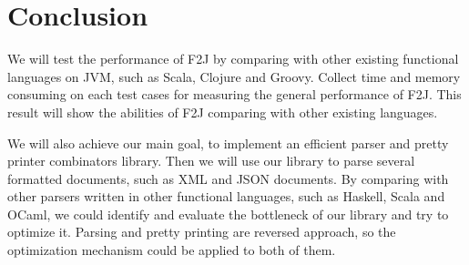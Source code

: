 \chapter{Conclusion}

We will test the performance of F2J by comparing with other existing functional languages on JVM, such as Scala, Clojure and Groovy. Collect time and memory consuming on each test cases for measuring the general performance of F2J. This result will show the abilities of F2J comparing with other existing languages.

We will also achieve our main goal, to implement an efficient parser and pretty printer combinators library. Then we will use our library to parse several formatted documents, such as XML and JSON documents. By comparing with other parsers written in other functional languages, such as Haskell, Scala and OCaml, we could identify and evaluate the bottleneck of our library and try to optimize it. Parsing and pretty printing are reversed approach, so the optimization mechanism could be applied to both of them.
